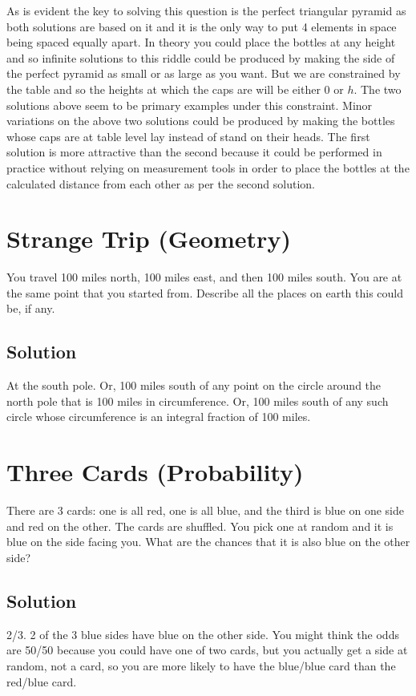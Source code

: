 \documentclass{article}
\begin{document}
As is evident the key to solving this question is the perfect triangular pyramid as both solutions are based on it and it is the only
way to put 4 elements in space being spaced equally apart. In theory you could place the bottles at any height and so
infinite solutions to this riddle could be produced by making the side of the perfect pyramid as small or as large as you want. But we are
constrained by the table and so the heights at which the caps are will be either $0$ or $h$. The two solutions above seem to be primary
examples under this constraint. Minor variations on the above two solutions could be produced by making the bottles whose caps are at table
level lay instead of stand on their heads. The first solution is more attractive than the second because it could be performed in practice
without relying on measurement tools in order to place the bottles at the calculated distance from each other as per the second solution.

\section{Strange Trip (Geometry)}
You travel 100 miles north, 100 miles east, and then 100 miles south. You are at the same point that you started from. Describe all the places on earth this could be, if any.

\subsection{Solution}
At the south pole. Or, 100 miles south of any point on the circle around the north pole that is 100 miles in circumference. Or, 100 miles south of any such circle whose circumference is an integral fraction of 100 miles.

\section{Three Cards (Probability)}
There are 3 cards: one is all red, one is all blue, and the third is blue on one side and red on the other. The cards are shuffled. You pick one at random and it is blue on the side facing you. What are the chances that it is also blue on the other side?

\subsection{Solution}
2/3. 2 of the 3 blue sides have blue on the other side. You might think the odds are 50/50 because you could have one of two cards, but you actually get a side at random, not a card, so you are more likely to have the blue/blue card than the red/blue card.
\end{document}
